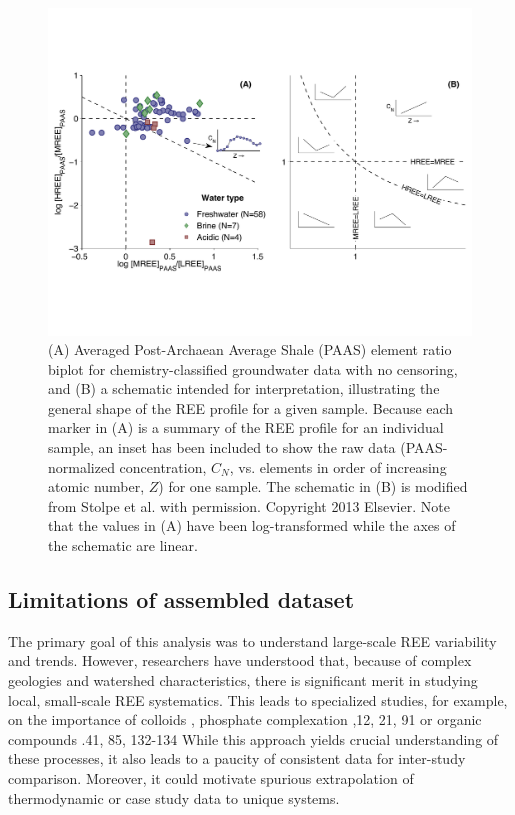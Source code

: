 \begin{figure}[htbp]
\begin{center}
\includegraphics[width=\textwidth]{Ch3_figures/RDV-grouped-biplot.pdf}
\caption{(A) Averaged Post-Archaean Average Shale (PAAS) element ratio biplot for chemistry-classified groundwater data with no censoring, and (B) a schematic intended for interpretation, illustrating the general shape of the REE profile for a given sample.
Because each marker in (A) is a summary of the REE profile for an individual sample, an inset has been included to show the raw data (PAAS-normalized concentration, $C_N$, vs. elements in order of increasing atomic number, $Z$) for one sample.
The schematic in (B) is modified from Stolpe et al. \citep{Stolpe_GCA_2013} with permission.
Copyright 2013 Elsevier.
Note that the values in (A) have been log-transformed while the axes of the schematic are linear.}\label{fig:RDV-biplot}
\end{center}
\end{figure}

\subsection{Limitations of assembled dataset}

The primary goal of this analysis was to understand large-scale REE variability and trends.
However, researchers have understood that, because of complex geologies and watershed characteristics, there is significant merit in studying local, small-scale REE systematics.
This leads to specialized studies, for example, on the importance of colloids \citep{Dia_GCA_2000, Pourret_AG_2010, Stolpe_GCA_2013, Ingri_CG_2000, Sholkovitz_EPSL_1992},
phosphate complexation \citep{Hannigan_CG_2001, Johannesson_EPSL_1996, Johannesson_LO_1994},12, 21, 91
or organic compounds \citep{}.41, 85, 132-134 
While this approach yields crucial understanding of these processes, it also leads to a paucity of consistent data for inter-study comparison.
Moreover, it could motivate spurious extrapolation of thermodynamic or case study data to unique systems.







